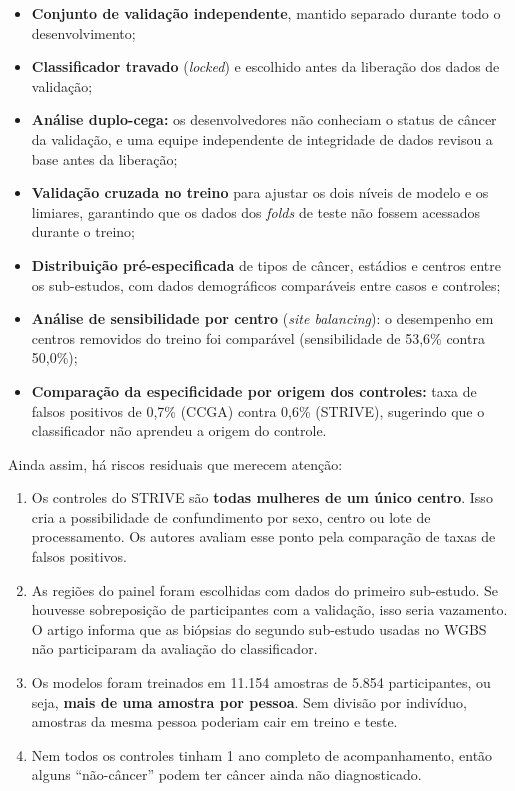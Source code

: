 \documentclass[11pt,a4paper]{article}
\providecommand{\tightlist}{\setlength{\itemsep}{0pt}\setlength{\parskip}{0pt}}
\begin{document}
\begin{itemize}
\tightlist
\item
  \textbf{Conjunto de validação independente}, mantido separado durante todo o
  desenvolvimento;
\item
  \textbf{Classificador travado} (\emph{locked}) e escolhido antes da liberação
  dos dados de validação;
\item
  \textbf{Análise duplo-cega:} os desenvolvedores não conheciam o status de
  câncer da validação, e uma equipe independente de integridade de dados revisou
  a base antes da liberação;
\item
  \textbf{Validação cruzada no treino} para ajustar os dois níveis de modelo e
  os limiares, garantindo que os dados dos \emph{folds} de teste não fossem
  acessados durante o treino;
\item
  \textbf{Distribuição pré-especificada} de tipos de câncer, estádios e centros
  entre os sub-estudos, com dados demográficos comparáveis entre casos e
  controles;
\item
  \textbf{Análise de sensibilidade por centro} (\emph{site balancing}): o
  desempenho em centros removidos do treino foi comparável (sensibilidade de
  53,6\% contra 50,0\%);
\item
  \textbf{Comparação da especificidade por origem dos controles:} taxa de falsos
  positivos de 0,7\% (CCGA) contra 0,6\% (STRIVE), sugerindo que o classificador
  não aprendeu a origem do controle.
\end{itemize}

Ainda assim, há riscos residuais que merecem atenção:

\begin{enumerate}
\def\labelenumi{\arabic{enumi}.}
\tightlist
\item
  Os controles do STRIVE são \textbf{todas mulheres de um único centro}. Isso
  cria a possibilidade de confundimento por sexo, centro ou lote de
  processamento. Os autores avaliam esse ponto pela comparação de taxas de
  falsos positivos.
\item
  As regiões do painel foram escolhidas com dados do primeiro sub-estudo. Se
  houvesse sobreposição de participantes com a validação, isso seria vazamento.
  O artigo informa que as biópsias do segundo sub-estudo usadas no WGBS não
  participaram da avaliação do classificador.
\item
  Os modelos foram treinados em 11.154 amostras de 5.854 participantes, ou seja,
  \textbf{mais de uma amostra por pessoa}. Sem divisão por indivíduo, amostras
  da mesma pessoa poderiam cair em treino e teste.
\item
  Nem todos os controles tinham 1 ano completo de acompanhamento, então alguns
  ``não-câncer'' podem ter câncer ainda não diagnosticado.
\end{enumerate}
\end{document}
